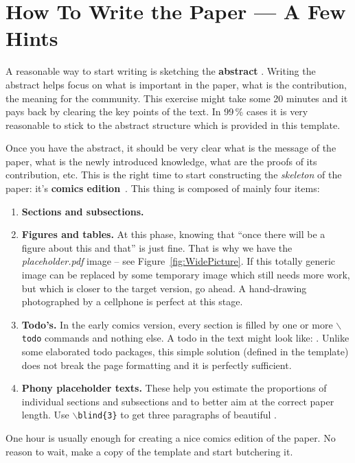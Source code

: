 \documentclass{ExcelAtFIT}
\begin{document}
\section{How To Write the Paper --- A Few Hints}
\label{sec:HowToWrite}

A reasonable way to start writing is sketching the \textbf{abstract} \cite{Herout-Abstract}.  Writing the abstract helps focus on what is important in the paper, what is the contribution, the meaning for the community.  This exercise might take some 20 minutes and it pays back by clearing the key points of the text.  
In 99\,\% cases it is very reasonable to stick to the abstract structure \cite{Lebrun2011} which is provided in this template.

Once you have the abstract, it should be very clear what is the message of the paper, what is the newly introduced knowledge, what are the proofs of its contribution, etc.  This is the right time to start constructing the \emph{skeleton} of the paper: it's \textbf{comics edition}~\cite{Herout-Comics}.
This thing is composed of mainly four items:
\begin{enumerate} [noitemsep]
	\item \textbf{Sections and subsections.}
	\item \textbf{Figures and tables.}  At this phase, knowing that ``once there will be a figure about this and that'' is just fine.  That is why we have the \textit{placeholder.pdf} image -- see Figure~\ref{fig:WidePicture}.  If this totally generic image can be replaced by some temporary image which still needs more work, but which is closer to the target version, go ahead. A hand-drawing photographed by a cellphone is perfect at this stage.
	\item \textbf{Todo's.} In the early comics version, every section is filled by one or more \texttt{$\backslash$todo} commands and nothing else.  A todo in the text might look like: .  Unlike some elaborated todo packages, this simple solution (defined in the template) does not break the page formatting and it is perfectly sufficient.
	\item \textbf{Phony placeholder texts.}  These help you estimate the proportions of individual sections and subsections and to better aim at the correct paper length. Use \texttt{$\backslash$blind\{3\}} to get three paragraphs of beautiful .
\end{enumerate}
One hour is usually enough for creating a nice comics edition of the paper.  No reason to wait, make a copy of the template and start butchering it. 
\end{document}

